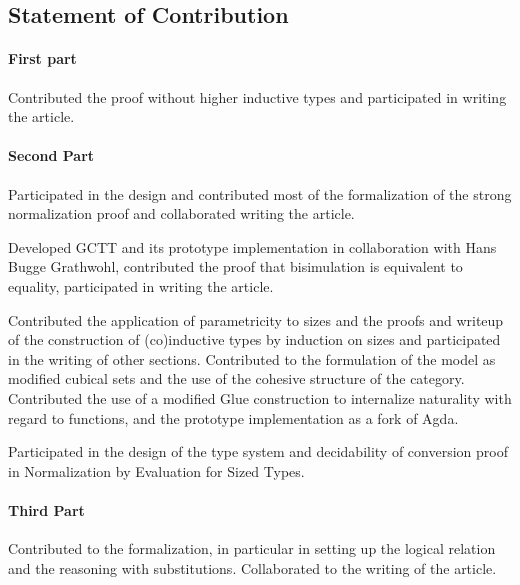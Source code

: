 \documentclass{book}
\begin{document}
\subsection{Statement of Contribution}
\paragraph{First part}
Contributed the proof without higher inductive types and participated
in writing the article.

\paragraph{Second Part}
Participated in the design and contributed most of the formalization
of the strong normalization proof and collaborated writing the
article.

Developed GCTT and its prototype implementation in collaboration with
Hans Bugge Grathwohl, contributed the proof that bisimulation is
equivalent to equality, participated in writing the article.

Contributed the application of parametricity to sizes and the proofs
and writeup of the construction of (co)inductive types by induction on
sizes and participated in the writing of other sections. Contributed
to the formulation of the model as modified cubical sets and the use
of the cohesive structure of the category. Contributed the use of a
modified Glue construction to internalize naturality with regard to
functions, and the prototype implementation as a fork of Agda.

Participated in the design of the type system and decidability of
conversion proof in Normalization by Evaluation for Sized Types.
\paragraph{Third Part}
Contributed to the formalization, in particular in setting up the
logical relation and the reasoning with substitutions. Collaborated
to the writing of the article.
\end{document}
